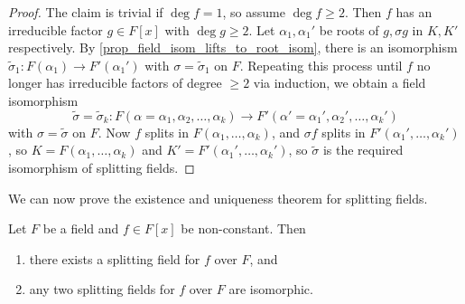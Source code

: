 \begin{proof}
    The claim is trivial if $\deg{f} = 1$, so assume $\deg{f} \geq 2$. Then $f$ has an irreducible factor $g \in F[x]$ with $\deg{g} \geq 2$. Let $\alpha_1, \alpha_1'$ be roots of $g, \sigma g$ in $K, K'$ respectively. By \cref{prop_field_isom_lifts_to_root_isom}, there is an isomorphism $\widetilde{\sigma}_1: F(\alpha_1) \to F'(\alpha_1')$ with $\sigma = \widetilde{\sigma}_1$ on $F$. Repeating this process until $f$ no longer has irreducible factors of degree $\geq 2$ via induction, we obtain a field isomorphism
    \[
        \widetilde{\sigma} = \widetilde{\sigma}_k: F(\alpha = \alpha_1, \alpha_2, \ldots, \alpha_k) \to F'(\alpha' = \alpha_1', \alpha_2', \ldots, \alpha_k')
    \]
    with $\sigma = \widetilde{\sigma}$ on $F$. Now $f$ splits in $F(\alpha_1, \ldots, \alpha_k)$, and $\sigma f$ splits in $F'(\alpha_1', \ldots, \alpha_k')$, so $K = F(\alpha_1, \ldots, \alpha_k)$ and $K' = F'(\alpha_1', \ldots, \alpha_k')$, so $\widetilde{\sigma}$ is the required isomorphism of splitting fields.
\end{proof}

We can now prove the existence and uniqueness theorem for splitting fields.

\begin{theorem}
\label{thm_exist_uniq_of_spl_field}
    Let $F$ be a field and $f \in F[x]$ be non-constant. Then
    \begin{enumerate}[label=(\alph*)]
        \item there exists a splitting field for $f$ over $F$, and
        \item any two splitting fields for $f$ over $F$ are isomorphic.
    \end{enumerate}
\end{theorem}


